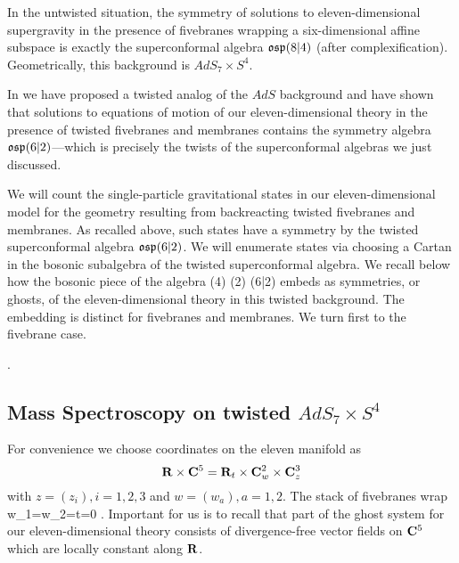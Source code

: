In the untwisted situation, the symmetry of solutions to eleven-dimensional supergravity in the presence of fivebranes wrapping a six-dimensional affine subspace is exactly the superconformal algebra $\mathfrak{osp}(8|4)$ (after complexification). 
Geometrically, this background is $AdS_7 \times S^4$. 

In \cite{RSW} we have proposed a twisted analog of the $AdS$ background and have shown that solutions to equations of motion of our eleven-dimensional theory in the presence of twisted fivebranes and membranes contains the symmetry algebra $\mathfrak{osp}(6|2)$---which is precisely the twists of the superconformal algebras we just discussed.

We will count the single-particle gravitational states in our eleven-dimensional model for the geometry resulting from backreacting twisted fivebranes and membranes.
As recalled above, such states have a symmetry by the twisted superconformal algebra $\mathfrak{osp}(6|2)$.
We will enumerate states via choosing a Cartan in the bosonic subalgebra of the twisted superconformal algebra. 
We recall below how the bosonic piece of the algebra
\beqn
\label{eqn:gut}
(4) \times {}(2) \subset {}(6|2) 
\eeqn
embeds as symmetries, or ghosts, of the eleven-dimensional theory in this twisted background.
The embedding is distinct for fivebranes and membranes.
We turn first to the fivebrane case.

.

\subsection{Mass Spectroscopy on twisted $AdS_7\times S^{4}$}
\label{s:ads7}

For convenience we choose coordinates on the eleven manifold as
\[
\mathbf{R} \times \mathbf{C}^5 = \mathbf{R}_t \times \mathbf{C}^2_w \times \mathbf{C}_z^3 
\]
with $z = (z_i), i=1,2,3$ and $w = (w_a), a=1,2$.
The stack of fivebranes wrap 
\beqn
w_1=w_2=t=0 .
\eeqn
Important for us is to recall that part of the ghost system for our eleven-dimensional theory consists of divergence-free vector fields on $\mathbf{C}^5$ which are locally constant along $\mathbf{R}$. 

